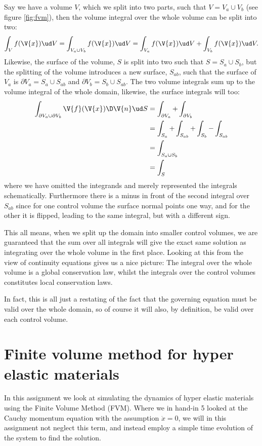 \documentclass[sigconf]{acmart}
\begin{document}
Say we have a volume $ V $, which we split into two parts, such that $ V= V_a\cup V_b$ (see figure \ref{fig:fvm}), then the volume integral over the whole volume can be split into two:
\begin{equation*}\label{key}
	\int_{V} f(\V{x}) \ud V = \int_{V_a \cup V_b} f(\V{x}) \ud V = \int_{V_a}f(\V{x}) \ud V + \int_{V_b} f(\V{x}) \ud V.
\end{equation*}
Likewise, the surface of the volume, $ S $ is split into two such that $ S = S_a \cup S_b $, but the splitting of the volume introduces a new surface, $ S_{ab} $, such that the surface of $ V_a $ is $ \partial V_a = S_a \cup S_{ab} $ and $ \partial V_b = S_b \cup S_{ab} $. The two volume integrals sum up to the volume integral of the whole domain, likewise, the surface integrals will too:
\begin{align*}\label{key}
	\int_{\partial V_a \cup \partial V_b} \V{f}(\V{x})\D \V{n} \ud S &= \int_{\partial V_a}  + \int_{\partial V_b}  \\
	&= \int_{S_a}+\int_{S_{ab}}+\int_{S_b} - \int_{S_{ab}}\\
	& = \int_{S_a\cup S_b} \\
	&= \int_S 
\end{align*}
where we have omitted the integrands and merely represented the integrals schematically. Furthermore there is a minus in front of the second integral over $ S_{ab} $ since for one control volume the surface normal points one way, and for the other it is flipped, leading to the same integral, but with a different sign.


This all means, when we split up the domain into smaller control volumes, we are guaranteed that the sum over all integrals will give the exact same solution as integrating over the whole volume in the first place. Looking at this from the view of continuity equations gives us a nice picture: The integral over the whole volume is a global conservation law, whilst the integrals over the control volumes constitutes local conservation laws.

In fact, this is all just a restating of the fact that the governing equation must be valid over the whole domain, so of course it will also, by definition, be valid over each control volume.

\section{Finite volume method for hyper elastic materials}
In this assignment we look at simulating the dynamics of hyper elastic materials using the Finite Volume Method (FVM). Where we in hand-in 5 looked at the Cauchy momentum equation with the assumption $ \ddot{x}=0 $, we will in this assignment not neglect this term, and instead employ a simple time evolution of the system to find the solution.
\end{document}
